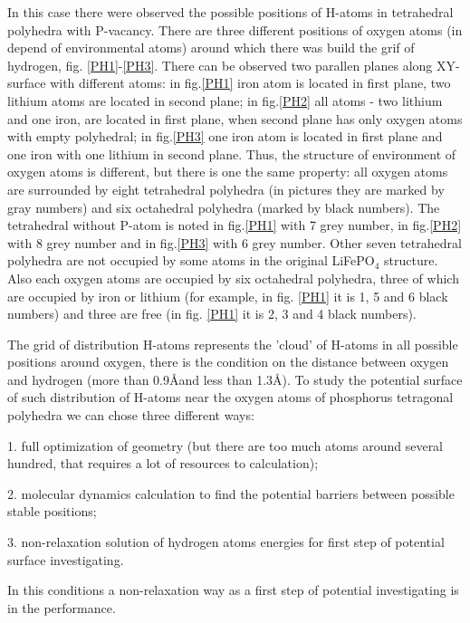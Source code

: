 \documentclass[11pt]{article}
\begin{document}
In this case there were observed the possible positions of H-atoms in tetrahedral polyhedra with P-vacancy. There are three different positions of oxygen atoms (in depend of environmental atoms) around which there was build the grif of hydrogen, fig. \ref{PH1}-\ref{PH3}. There can be observed two parallen planes along XY-surface with different atoms: in fig.\ref{PH1} iron atom is located in first plane, two lithium atoms are located in second plane; in fig.\ref{PH2} all atoms - two lithium and one iron, are located in first plane, when second plane has only oxygen atoms with empty polyhedral; in fig.\ref{PH3} one iron atom is located in first plane and one iron with one lithium in second plane. Thus, the structure of environment of oxygen atoms is different, but there is one the same property: all oxygen atoms are surrounded by eight tetrahedral polyhedra (in pictures they are marked by gray numbers) and six octahedral polyhedra (marked by black numbers). The tetrahedral without P-atom is noted in fig.\ref{PH1} with 7 grey number, in  fig.\ref{PH2} with 8 grey number and  in fig.\ref{PH3} with 6 grey number. Other seven tetrahedral polyhedra are not occupied by some atoms in the original LiFePO$_4$ structure. Also each oxygen atoms are occupied by six octahedral polyhedra, three of which are occupied by iron or lithium (for example, in fig. \ref{PH1} it is 1, 5 and 6 black numbers) and three are free (in fig. \ref{PH1} it is 2, 3 and 4 black numbers).

The grid of distribution H-atoms represents the 'cloud' of H-atoms in all possible positions around oxygen, there is the condition on the distance between oxygen and hydrogen (more than 0.9\AA and less than 1.3\AA). To study the potential surface of such distribution of H-atoms near the oxygen atoms of phosphorus tetragonal polyhedra we can chose three different ways:

1. full optimization of geometry (but there are too much atoms around several hundred, that requires a lot of resources to calculation);

2. molecular dynamics calculation to find the potential barriers between possible stable positions;

3. non-relaxation solution of hydrogen atoms energies for first step of potential surface investigating.

In this conditions a non-relaxation way as a first step of potential investigating is in the performance. 
   
\end{document}

